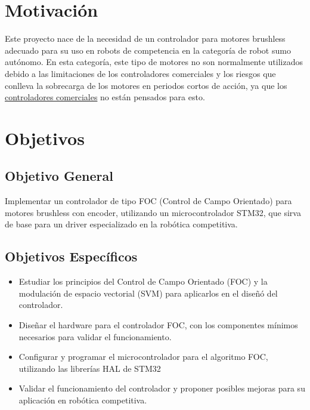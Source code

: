 \documentclass[11pt]{report}
\begin{document}
\newpage
\section{Motivación}
Este proyecto nace de la necesidad de un controlador para motores brushless adecuado para su uso en robots de competencia en la categoría de robot sumo autónomo. En esta categoría, este tipo de motores no son normalmente utilizados debido a las limitaciones de los controladores comerciales y los riesgos que conlleva la sobrecarga de los motores en periodos cortos de acción, ya que los \href{https://www.youtube.com/watch?v=SmDZmGU08BM}{controladores comerciales} no están pensados para esto.

\section{Objetivos}
\subsection{Objetivo General}
Implementar un controlador de tipo FOC (Control de Campo Orientado) para motores brushless con encoder, utilizando un microcontrolador STM32, que sirva de base para un driver especializado en la robótica competitiva.

\subsection{Objetivos Específicos}
\begin{itemize}
	\item Estudiar los principios del Control de Campo Orientado (FOC) y la modulación de espacio vectorial (SVM) para aplicarlos en el diseñó del controlador.
	\item Diseñar el hardware para el controlador FOC, con los componentes mínimos necesarios para validar el funcionamiento.
	\item Configurar y programar el microcontrolador para el algoritmo FOC, utilizando las librerías HAL de STM32
	\item Validar el funcionamiento del controlador y proponer posibles mejoras para su aplicación en robótica competitiva.
\end{itemize}

\newpage
\end{document}
